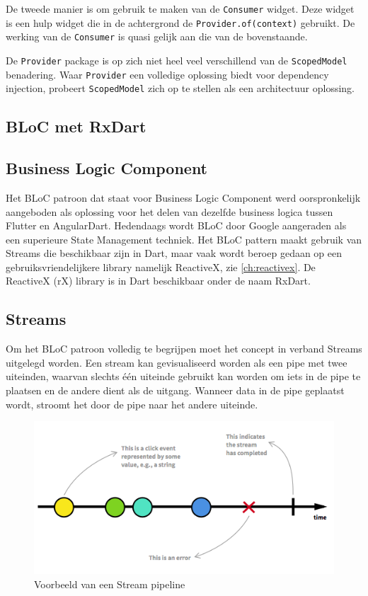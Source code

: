 De tweede manier is om gebruik te maken van de \verb|Consumer| widget. Deze widget is een hulp widget die in de achtergrond de \verb|Provider.of(context)| gebruikt. De werking van de \verb|Consumer| is quasi gelijk aan die van de bovenstaande. 

De \verb|Provider| package is op zich niet heel veel verschillend van de \verb|ScopedModel| benadering. Waar \verb|Provider| een volledige oplossing biedt voor dependency injection, probeert \verb|ScopedModel| zich op te stellen als een architectuur oplossing.

\subsection{BLoC met RxDart}
\subsection*{Business Logic Component}
Het BLoC patroon dat staat voor Business Logic Component werd oorspronkelijk aangeboden als oplossing voor het delen van dezelfde business logica tussen Flutter en AngularDart. Hedendaags wordt BLoC door Google aangeraden als een superieure State Management techniek. Het BLoC pattern maakt gebruik van Streams die beschikbaar zijn in Dart, maar vaak wordt beroep gedaan op een gebruiksvriendelijkere library namelijk ReactiveX, zie \ref{ch:reactivex}.
\newline
De ReactiveX (rX) library is in Dart beschikbaar onder de naam RxDart.

\subsection*{Streams}
Om het BLoC patroon volledig te begrijpen moet het concept in verband Streams uitgelegd worden.
Een stream kan gevisualiseerd worden als een pipe met twee uiteinden, waarvan slechts
één uiteinde gebruikt kan worden om iets in de pipe te plaatsen en de andere dient als de uitgang. Wanneer data in de pipe
geplaatst wordt, stroomt het door de pipe naar het andere uiteinde. \autocite{Boelens2018}

\begin{figure}[H]
    \centering
    \includegraphics[width=\figureWidthModifier\linewidth]{img/stand-van-zaken/stream-pipeline.png}
    \caption{Voorbeeld van een Stream pipeline \textcite{Staltz2019}} 
    \label{fig:stream-pipeline}
\end{figure}

